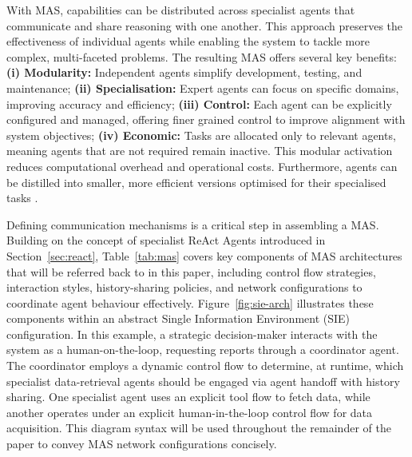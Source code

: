 \documentclass{article}
\begin{document}
With MAS, capabilities can be distributed across specialist agents that communicate and share reasoning with one another. This approach preserves the effectiveness of individual agents while enabling the system to tackle more complex, multi-faceted problems. The resulting MAS offers several key benefits: \textbf{(i) Modularity:} Independent agents simplify development, testing, and maintenance; \textbf{(ii) Specialisation:} Expert agents can focus on specific domains, improving accuracy and efficiency; \textbf{(iii) Control:} Each agent can be explicitly configured and managed, offering finer grained control to improve alignment with system objectives; \textbf{(iv) Economic:} Tasks are allocated only to relevant agents, meaning agents that are not required remain inactive. This modular activation reduces computational overhead and operational costs. Furthermore, agents can be distilled into smaller, more efficient versions optimised for their specialised tasks \cite{yang2024effective}.

Defining communication mechanisms is a critical step in assembling a MAS. Building on the concept of specialist ReAct Agents introduced in Section~\ref{sec:react}, Table~\ref{tab:mas} covers key components of MAS architectures that will be referred back to in this paper, including control flow strategies, interaction styles, history-sharing policies, and network configurations to coordinate agent behaviour effectively. Figure~\ref{fig:sie-arch} illustrates these components within an abstract Single Information Environment (SIE) configuration. In this example, a strategic decision-maker interacts with the system as a human-on-the-loop, requesting reports through a coordinator agent. The coordinator employs a dynamic control flow to determine, at runtime, which specialist data-retrieval agents should be engaged via agent handoff with history sharing. One specialist agent uses an explicit tool flow to fetch data, while another operates under an explicit human-in-the-loop control flow for data acquisition. This diagram syntax will be used throughout the remainder of the paper to convey MAS network configurations concisely.
\end{document}
